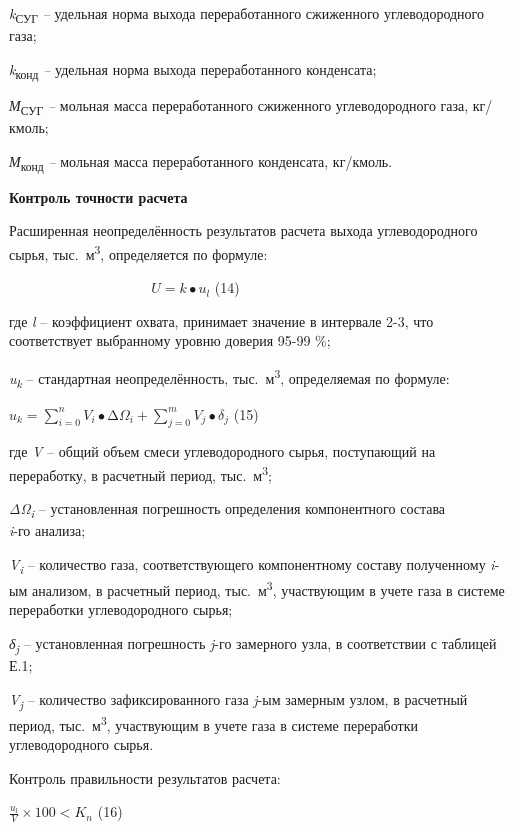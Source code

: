 \emph{k}\textsubscript{СУГ} \emph{--} удельная норма выхода
переработанного сжиженного углеводородного газа;

\emph{k}\textsubscript{конд} \emph{--} удельная норма выхода
переработанного конденсата;

\emph{М}\textsubscript{СУГ} \emph{--} мольная масса переработанного
сжиженного углеводородного газа, кг/кмоль;

\emph{М}\textsubscript{конд} \emph{--} мольная масса переработанного
конденсата, кг/кмоль.

{\bfseries Контроль точности расчета}

Расширенная неопределённость результатов расчета выхода углеводородного
сырья, тыс.~м\textsuperscript{3}, определяется по формуле:

\(\ \ \ \ \ \ \ \ \ \ \ \ \ \ \ \ \ \ \ \ \ \ \ \ \ \ \ \ \ \ \ \ \ \ \ \ \ \ \ \ \ \ \ \ \ \ U = k \bullet u_{l}\)
(14)

где \emph{l} -- коэффициент охвата, принимает значение в интервале 2-3,
что соответствует выбранному уровню доверия 95-99 \%;

\emph{u\textsubscript{k}} -- стандартная неопределённость,
тыс.~м\textsuperscript{3}, определяемая по формуле:

\(u_{k} = \sum_{i = 0}^{n}{V_{i} \bullet \mathrm{\Delta}\Omega_{i}} + \sum_{j = 0}^{m}{V_{j} \bullet \delta_{j}}\)
(15)

где \emph{V} -- общий объем смеси углеводородного сырья, поступающий на
переработку, в расчетный период, тыс.~м\textsuperscript{3};

\emph{ΔΩ\textsubscript{i}} -- установленная погрешность определения
компонентного состава\\
\emph{i}-го анализа;

\emph{V\textsubscript{i}} -- количество газа, соответствующего
компонентному составу полученному \emph{i}-ым анализом, в расчетный
период, тыс.~м\textsuperscript{3}, участвующим в учете газа в системе
переработки углеводородного сырья;

\emph{δ\textsubscript{j}} -- установленная погрешность \emph{j}-го
замерного узла, в соответствии с таблицей Е.1;

\emph{V\textsubscript{j}} -- количество зафиксированного газа
\emph{j}-ым замерным узлом, в расчетный период,
тыс.~м\textsuperscript{3}, участвующим в учете газа в системе
переработки углеводородного сырья.

Контроль правильности результатов расчета:

\(\frac{u_{l}}{V} \times 100 < K_{n}\) (16)

